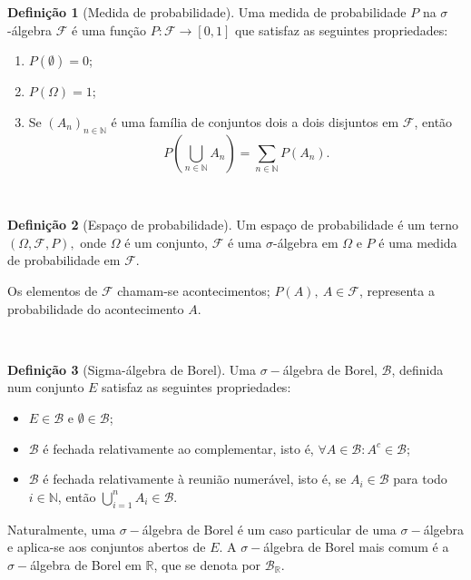 \documentclass[
  11pt,
  a4paper,
]{book}
\theoremstyle{definition}
\newtheorem{definition}{Definição}[chapter]
\theoremstyle{definition}
\theoremstyle{definition}
\theoremstyle{definition}
\theoremstyle{remark}
\begin{document}
\begin{definition}[Medida de probabilidade]

Uma medida de probabilidade \(P\) na \(\sigma\)-álgebra \(\mathcal{F}\) é uma função \(P: \mathcal{F} \rightarrow [0,1]\) que satisfaz as seguintes propriedades:

\begin{enumerate}
\def\labelenumi{\roman{enumi})}
\item
  \(P(\emptyset) = 0\);
\item
  \(P(\Omega) = 1\);
\item
  Se \((A_n)_{n \in \mathbb{N}}\) é uma família de conjuntos dois a dois disjuntos em \(\mathcal{F}\), então
  \[P\left(\bigcup_{n \in \mathbb{N}}{A_n}\right)=\sum_{n \in \mathbb{N}}{P(A_n)}.\]
\end{enumerate}

\end{definition}

\(\,\)

\begin{definition}[Espaço de probabilidade]
Um espaço de probabilidade é um terno \((\Omega,\mathcal{F},P),\) onde \(\Omega\) é um conjunto, \(\mathcal{F}\) é uma \(\sigma\)-álgebra em \(\Omega\) e \(P\) é uma medida de probabilidade em \(\mathcal{F}\).

Os elementos de \(\mathcal{F}\) chamam-se acontecimentos; \(P(A), ~A \in \mathcal{F}\), representa a probabilidade do acontecimento \(A\).
\end{definition}

\(\,\)

\begin{definition}[Sigma-álgebra de Borel]
Uma \(\sigma-\)álgebra de Borel, \(\mathcal{B}\), definida num conjunto \(E\) satisfaz as seguintes propriedades:

\begin{itemize}
\item
  \(E \in \mathcal{B}\) e \(\emptyset \in \mathcal{B}\);
\item
  \(\mathcal{B}\) é fechada relativamente ao complementar, isto é,
  \(\forall A \in \mathcal{B}: A^c \in \mathcal{B}\);
\item
  \(\mathcal{B}\) é fechada relativamente à reunião numerável, isto é, se \(A_i \in \mathcal{B}\) para todo \(i \in \mathbb{N}\), então \(\bigcup\limits_{i=1}^{n} A_i \in \mathcal{B}\).
\end{itemize}

Naturalmente, uma \(\sigma-\)álgebra de Borel é um caso particular de uma \(\sigma-\)álgebra e aplica-se aos conjuntos abertos de \(E\). A \(\sigma-\)álgebra de Borel mais comum é a \(\sigma-\)álgebra de Borel em \(\mathbb{R}\), que se denota por \(\mathcal{B}_{\mathbb{R}}\).
\end{definition}
\end{document}
